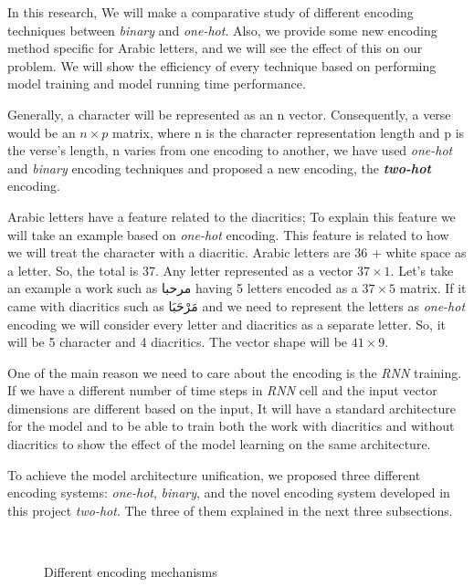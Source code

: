 In this research, We will make a comparative study of different encoding techniques between \textit{binary} and \textit{one-hot}. Also, we provide some new encoding method specific for Arabic letters, and we will see the effect of this on our problem. We will show the efficiency of every technique based on performing model training and model running time performance.

Generally, a character will be represented as an n vector. Consequently, a verse would be an $n \times p$ matrix, where n is the character representation length and p is the verse’s length, n varies from one encoding to another, we have used \textit{one-hot} and \textit{binary} encoding techniques and proposed a new encoding, the \textbf{\textit{two-hot}} encoding.

Arabic letters have a feature related to the diacritics; To explain this feature we will take an example based on \textit{\textit{one-hot}} encoding. This feature is related to how we will treat the character with a diacritic. Arabic letters are 36 + white space as a letter. So, the total is 37. Any letter represented as a vector $37 \times 1$. Let's take an example a work such as \textarabic{مرحبا} having 5 letters encoded as a $37 \times 5$ matrix. If it came with diacritics such as \textarabic{مَرْحَبَا} and we need to represent the letters as \textit{one-hot} encoding we will consider every letter and diacritics as a separate letter. So, it will be 5 character and 4 diacritics. The vector shape will be $41 \times 9$.

One of the main reason we need to care about the encoding is the \textit{RNN} training. If we have a different number of time steps in \textit{RNN} cell and the input vector dimensions are different based on the input, It will have a standard architecture for the model and to be able to train both the work with diacritics and without diacritics to show the effect of the model learning on the same architecture.

To achieve the model architecture unification,  we proposed three different encoding systems: \textit{\textit{one-hot}}, \textit{\textit{binary}}, and the novel encoding system developed in this project \textit{\textit{two-hot}}. The three of them explained in the next three subsections.

\begin{figure}[!t]
  \centering
  
  \caption{Different encoding mechanisms%
  }~\label{Fig:One_binary_Encoding}
\end{figure}



